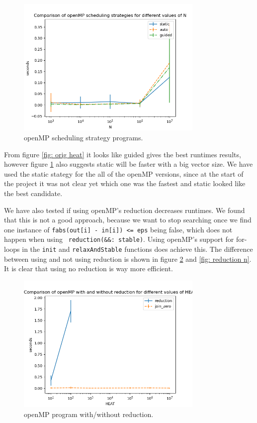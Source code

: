 \documentclass[a4paper]{article}
\begin{document}
\begin{figure}[H]
    \centering
    \includegraphics[width = 0.8\textwidth]{graphs/Comparison of openMP scheduling strategies for different values of N.png}
    \caption{openMP scheduling strategy programs.}
    \label{fig: strategy n}
\end{figure}

From figure \ref{fig: orig heat} it looks like guided gives the best runtimes results, however figure \ref{fig: strategy n} also suggests static will be faster with a big vector size. We have used the static stategy for the all of the openMP versions, since at the start of the project it was not clear yet which one was the fastest and static looked like the best candidate.

We have also tested if using openMP's reduction decreases runtimes. We found that this is not a good approach, because we want to stop searching once we find one instance of \texttt{fabs(out[i] - in[i]) <= eps} being false, which does not happen when using \texttt{ reduction(\&\&: stable)}. Using openMP's support for for-loops in the \texttt{init} and \texttt{relaxAndStable} functions does achieve this. The difference between using and not using reduction is shown in figure \ref{fig: reduction heat} and \ref{fig: reduction n}. It is clear that using no reduction is way more efficient.

\begin{figure}[H]
    \centering
    \includegraphics[width = 0.8\textwidth]{graphs/heat/Comparison of openMP with and without reduction for different values of HEAT.png}
    \caption{openMP program with/without reduction.}
    \label{fig: reduction heat}
\end{figure}
\end{document}
